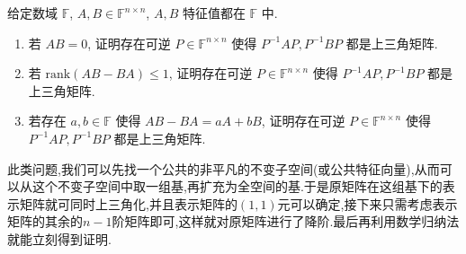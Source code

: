 \documentclass[../../main.tex]{subfiles}
\begin{document}
\begin{example}
给定数域 \( \mathbb{F} \), \( A, B \in \mathbb{F}^{n \times n} \), \( A, B \) 特征值都在 \( \mathbb{F} \) 中.
\begin{enumerate}
\item 若 \( AB = 0 \), 证明存在可逆 \( P \in \mathbb{F}^{n \times n} \) 使得 \( P^{-1}AP, P^{-1}BP \) 都是上三角矩阵.

\item 若 \( \mathrm{rank}(AB - BA) \leqslant 1 \), 证明存在可逆 \( P \in \mathbb{F}^{n \times n} \) 使得 \( P^{-1}AP, P^{-1}BP \) 都是上三角矩阵.

\item 若存在 \( a, b \in \mathbb{F} \) 使得 \( AB - BA = aA + bB \), 证明存在可逆 \( P \in \mathbb{F}^{n \times n} \) 使得 \( P^{-1}AP, P^{-1}BP \) 都是上三角矩阵.
\end{enumerate}
\end{example}
\begin{note}
此类问题,我们可以先找一个公共的非平凡的不变子空间(或公共特征向量),从而可以从这个不变子空间中取一组基,再扩充为全空间的基.于是原矩阵在这组基下的表示矩阵就可同时上三角化,并且表示矩阵的$(1,1)$元可以确定,接下来只需考虑表示矩阵的其余的$n-1$阶矩阵即可,这样就对原矩阵进行了降阶.最后再利用数学归纳法就能立刻得到证明.
\end{note}
\end{document}
